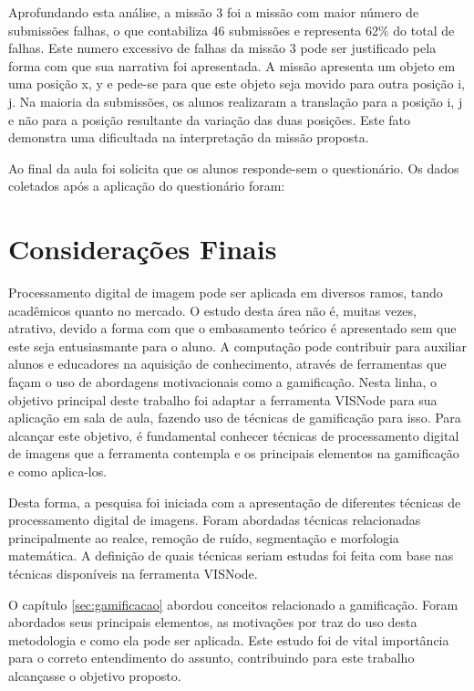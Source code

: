 \documentclass[
	12pt,				%
	oneside,			%
	a4paper,			%
	english,			%
	french,				%
	spanish,			%
	brazil,				%
	]{abntex2}
\begin{document}
Aprofundando esta análise, a missão 3 foi a missão com maior número de submissões falhas, o que contabiliza 46 submissões e representa 62\% do total de falhas. Este numero excessivo de falhas da missão 3 pode ser justificado pela forma com que sua narrativa foi apresentada. A missão apresenta um objeto em uma posição x, y e pede-se para que este objeto seja movido para outra posição i, j. Na maioria da submissões, os alunos realizaram a translação para a posição i, j e não para a posição resultante da variação das duas posições. Este fato demonstra uma dificultada na interpretação da missão proposta.

Ao final da aula foi solicita que os alunos responde-sem o questionário. Os dados coletados após a aplicação do questionário foram:

% 

\chapter[Considerações Finais]{Considerações Finais}

Processamento digital de imagem pode ser aplicada em diversos ramos, tando acadêmicos quanto no mercado. O estudo desta área não é, muitas vezes, atrativo, devido a forma com que o embasamento teórico é apresentado sem que este seja entusiasmante para o aluno. A computação pode contribuir para auxiliar alunos e educadores na aquisição de conhecimento, através de ferramentas que façam o uso de abordagens motivacionais como a gamificação. Nesta linha, o objetivo principal deste trabalho foi adaptar a ferramenta VISNode para sua aplicação em sala de aula, fazendo uso de técnicas de gamificação para isso. Para alcançar este objetivo, é fundamental conhecer técnicas de processamento digital de imagens que a ferramenta contempla e os principais elementos na gamificação e como aplica-los.

Desta forma, a pesquisa foi iniciada com a apresentação de diferentes técnicas de processamento digital de imagens. Foram abordadas técnicas relacionadas principalmente ao realce, remoção de ruído, segmentação e morfologia matemática. A definição de quais técnicas seriam estudas foi feita com base nas técnicas disponíveis na ferramenta VISNode.

O capítulo \ref{sec:gamificacao} abordou conceitos relacionado a gamificação. Foram abordados seus principais elementos, as motivações por traz do uso desta metodologia e como ela pode ser aplicada.
Este estudo foi de vital importância para o correto entendimento do assunto, contribuindo para este trabalho alcançasse o objetivo proposto.
\end{document}
